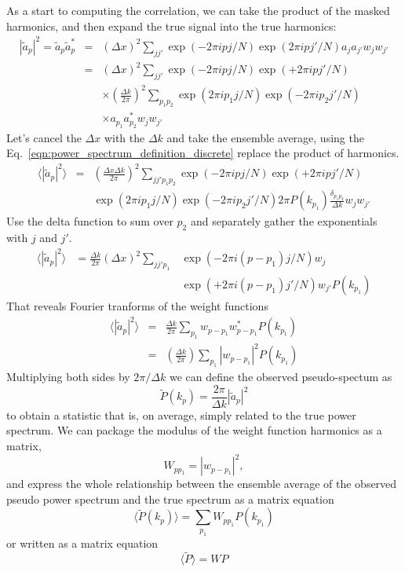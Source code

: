  As a start to computing the correlation, we can take the product of the masked harmonics, and then expand the true signal into the true harmonics:
 \begin{eqnarray}
   |\tilde a_p |^2 = \tilde a_p \tilde a_p^* &=&  (\Delta x)^2 \sum_{jj'} \exp(-2\pi i pj/N) \exp(2\pi i pj'/N) a_j  a_{j'} w_j w_{j'}  \nonumber \\
   &=&  (\Delta x)^2 \sum_{jj'} \exp(-2\pi i pj/N) \exp(+2\pi i pj'/N) \nonumber \\
   & & \times   \left(\frac{\Delta k}{2\pi}\right)^2 \sum_{p_1 p_2}  \exp(2\pi i p_1 j/N) \exp(-2\pi i p_2 j'/N) \nonumber \\
   & & \times a_{p_1} a^*_{p_2} w_j w_{j'}
 \end{eqnarray}
Let's cancel the $\Delta x$ with the $\Delta k$ and take the ensemble average, using the Eq.~\ref{eqn:power_spectrum_definition_discrete} replace the product of harmonics.
 \begin{eqnarray}
 \langle  |\tilde a_p |^2 \rangle &=& \left(\frac{\Delta x\Delta k}{2\pi}\right)^2  \sum_{jj'p_1p_2} \exp(-2\pi i pj/N)  \exp(+2\pi i pj'/N) \nonumber \\
 & & \exp(2\pi i p_1 j/N) \exp(-2\pi i p_2 j'/N){2\pi} P(k_{p_1}) \frac{\delta_{p_1 p_2}}{\Delta k} w_j w_{j'}
 \end{eqnarray}
Use the delta function to sum over $p_2$ and separately gather the exponentials with $j$ and $j'$.  
\begin{eqnarray}
 \langle   |\tilde a_p |^2 \rangle &= \frac{\Delta k}{2\pi}\left(\Delta x \right)^2  \sum_{jj'p_1}& \exp(-2\pi i (p-p_1)j/N)  w_j \nonumber \\
  & &  \exp(+2\pi i (p-p_1) j'/N)  w_{j'}   P(k_{p_1})
\end{eqnarray}
That reveals Fourier tranforms of the weight functions
\begin{eqnarray}
  \langle  |\tilde a_p |^2 \rangle &=& \frac{\Delta k}{2\pi}  \sum_{p_1} w_{p-p_1} w_{p-p_1}^*  P(k_{p_1}) \\
  &=& \left(\frac{\Delta k}{2\pi}\right)  \sum_{p_1} |w_{p-p_1}|^2  P(k_{p_1})
\end{eqnarray}
Multiplying both sides by $2\pi/\Delta k$ we can define the observed pseudo-spectum as
\begin{equation}
  \tilde P(k_p) = \frac{2\pi}{\Delta k} |\tilde a_p |^2
\end{equation}
to obtain a statistic that is, on average, simply related to the true power spectrum. We can package the modulus of the weight function harmonics as a matrix,
\begin{equation}
  W_{pp_1} =  |w_{p-p_1}|^2,
\end{equation}
and express the whole relationship between the ensemble average of the observed pseudo power spectrum and the true spectrum as a matrix equation
\begin{equation}
  \langle \tilde P(k_p) \rangle =  \sum_{p_1} W_{pp_1}  P(k_{p_1})
\end{equation}
or written as a matrix equation
\begin{equation}
  \langle \tilde P \rangle =  W  P \label{eqn:ensemble_mode_coupling_matrix_times_power}
\end{equation}


